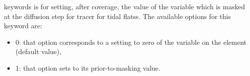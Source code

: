 keywords is for setting,
after coverage, the value of the variable which is masked
at the diffusion step for tracer for tidal flatss.
The available options for this keyword are:
\begin{itemize}
\item 0: that option corresponds to a setting to zero of the variable on the
element (default value),
\item 1: that option sets to its prior-to-masking value.
\end{itemize}
